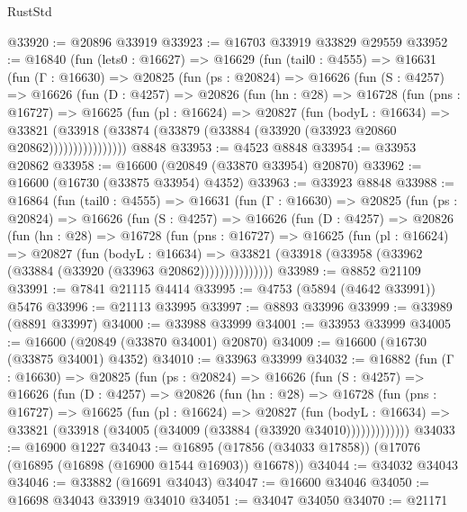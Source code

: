 \begin{lexlean}{RustStd}
\begin{coremodule}
@33920 := @20896 @33919
@33923 := @16703 @33919 @33829 @29559
@33952 := @16840
    (fun (lets0 : @16627) =>
    @16629
      (fun (tail0 : @4555) =>
      @16631
        (fun (Γ : @16630) =>
        @20825
          (fun (ps : @20824) =>
          @16626
            (fun (S : @4257) =>
            @16626
              (fun (D : @4257) =>
              @20826
                (fun (hn : @28) =>
                @16728
                  (fun (pns : @16727) =>
                  @16625
                    (fun (pl : @16624) =>
                    @20827
                      (fun (bodyL : @16634) =>
                      @33821
                        (@33918
                          (@33874 (@33879 (@33884 (@33920 (@33923 @20860 @20862))))))))))))))))
    @8848
@33953 := @4523 @8848
@33954 := @33953 @20862
@33958 := @16600 (@20849 (@33870 @33954) @20870)
@33962 := @16600 (@16730 (@33875 @33954) @4352)
@33963 := @33923 @8848
@33988 := @16864
    (fun (tail0 : @4555) =>
    @16631
      (fun (Γ : @16630) =>
      @20825
        (fun (ps : @20824) =>
        @16626
          (fun (S : @4257) =>
          @16626
            (fun (D : @4257) =>
            @20826
              (fun (hn : @28) =>
              @16728
                (fun (pns : @16727) =>
                @16625
                  (fun (pl : @16624) =>
                  @20827
                    (fun (bodyL : @16634) =>
                    @33821 (@33918 (@33958 (@33962 (@33884 (@33920 (@33963 @20862)))))))))))))))
@33989 := @8852 @21109
@33991 := @7841 @21115 @4414
@33995 := @4753 (@5894 (@4642 @33991)) @5476
@33996 := @21113 @33995
@33997 := @8893 @33996
@33999 := @33989 (@8891 @33997)
@34000 := @33988 @33999
@34001 := @33953 @33999
@34005 := @16600 (@20849 (@33870 @34001) @20870)
@34009 := @16600 (@16730 (@33875 @34001) @4352)
@34010 := @33963 @33999
@34032 := @16882
    (fun (Γ : @16630) =>
    @20825
      (fun (ps : @20824) =>
      @16626
        (fun (S : @4257) =>
        @16626
          (fun (D : @4257) =>
          @20826
            (fun (hn : @28) =>
            @16728
              (fun (pns : @16727) =>
              @16625
                (fun (pl : @16624) =>
                @20827
                  (fun (bodyL : @16634) =>
                  @33821 (@33918 (@34005 (@34009 (@33884 (@33920 @34010)))))))))))))
@34033 := @16900 @1227
@34043 := @16895 (@17856 (@34033 @17858)) (@17076 (@16895 (@16898 (@16900 @1544 @16903)) @16678))
@34044 := @34032 @34043
@34046 := @33882 (@16691 @34043)
@34047 := @16600 @34046
@34050 := @16698 @34043 @33919 @34010
@34051 := @34047 @34050
@34070 := @21171

\end{coremodule}
\end{lexlean}
